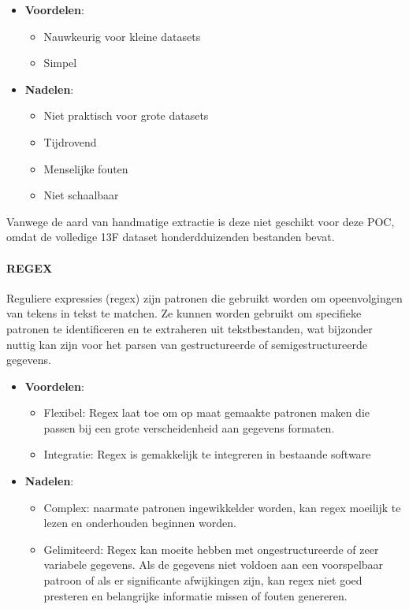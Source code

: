 \begin{itemize}
    \item \textbf{Voordelen}:
    \begin{itemize}
        \item Nauwkeurig voor kleine datasets
        \item Simpel
    \end{itemize}
    \item \textbf{Nadelen}:
    \begin{itemize}
        \item Niet praktisch voor grote datasets
        \item Tijdrovend
        \item Menselijke fouten
        \item Niet schaalbaar
    \end{itemize}
\end{itemize}
Vanwege de aard van handmatige extractie is deze niet geschikt voor deze POC, omdat de volledige 13F dataset honderdduizenden bestanden bevat.

\paragraph{REGEX}
Reguliere expressies (regex) zijn patronen die gebruikt worden om opeenvolgingen van tekens in tekst te matchen. Ze kunnen worden gebruikt om specifieke patronen te identificeren en te extraheren uit tekstbestanden, wat bijzonder nuttig kan zijn voor het parsen van gestructureerde of semigestructureerde gegevens.
\begin{itemize}
    \item \textbf{Voordelen}:
    \begin{itemize}
        \item Flexibel: Regex laat toe om op maat gemaakte patronen maken die passen bij een grote verscheidenheid aan gegevens formaten.
        \item Integratie: Regex is gemakkelijk te integreren in bestaande software
    \end{itemize}
    \item \textbf{Nadelen}:
    \begin{itemize}
        \item Complex: naarmate patronen ingewikkelder worden, kan regex moeilijk te lezen en onderhouden beginnen worden.
        \item Gelimiteerd: Regex kan moeite hebben met ongestructureerde of zeer variabele gegevens. Als de gegevens niet voldoen aan een voorspelbaar patroon of als er significante afwijkingen zijn, kan regex niet goed presteren en belangrijke informatie missen of fouten genereren.
    \end{itemize}
\end{itemize}




